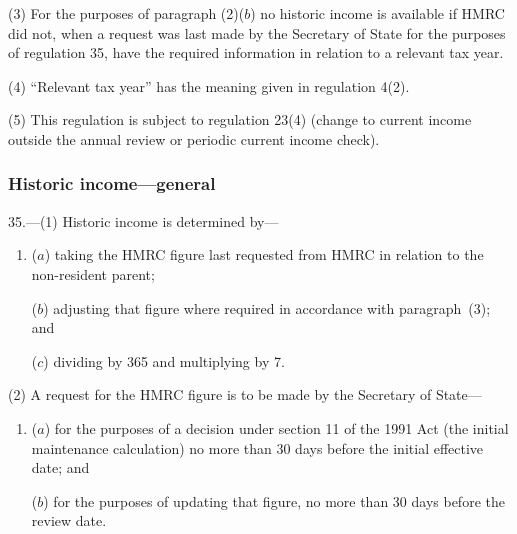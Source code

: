 \documentclass[12pt,a4paper]{article}
\begin{document}
(3) For the purposes of paragraph (2)($b$)  no historic income is available if HMRC did not, when a request was last made by the Secretary of State for the purposes of regulation 35, have the required information in relation to a relevant tax year.

(4) “Relevant tax year” has the meaning given in regulation 4(2).

(5) This regulation is subject to regulation 23(4) (change to current income outside the annual review or periodic current income check).


\subsubsection[35. Historic income---general]{Historic income---general}

35.---(1)  Historic income is determined by—
\begin{enumerate}\item[]
($a$) taking the HMRC figure last requested from HMRC in relation to the non-resident parent;

\begin{sloppypar}
($b$) adjusting that figure where required in accordance with paragraph~(3); and
\end{sloppypar}

($c$) dividing by 365 and multiplying by 7.
\end{enumerate}

(2) A request for the HMRC figure is to be made by the Secretary of State—
\begin{enumerate}\item[]
($a$) for the purposes of a decision under section 11 of the 1991 Act (the initial maintenance calculation) no more than 30 days before the initial effective date; and

($b$) for the purposes of updating that figure, no more than 30 days before the review date.
\end{enumerate}
\end{document}
